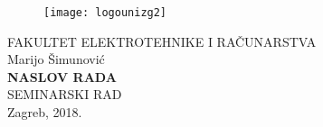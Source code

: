 \documentclass[12pt,oneside, a4paper]{article}
\numberwithin{equation}{section}
\renewcommand{\_}{\textscale{.7}{\textunderscore}}
\begin{document}
\begin{titlepage}
  \fontsize{16pt}{20pt}\selectfont
  \selectfont
  \setlength{\intextsep}{0pt plus 0pt minus 0pt}

  \begin{center}
    \begin{figure}[ht!]
      \begin{center}
        \texttt{[image: logo\_unizg2]}
      \end{center}
    \end{figure}		
    \vspace{0cm}
    {FAKULTET ELEKTROTEHNIKE I RAČUNARSTVA} \\
    \vspace{3cm}
    Marijo Šimunović \\
    \vspace{2cm}
    {\fontsize{22pt}{22pt}\selectfont\textbf{NASLOV RADA}} \\
    \vspace{2cm}    
    SEMINARSKI RAD \\
    \vspace{5cm}    %
    \vfill{Zagreb, 2018.}
  \end{center}
  \restoregeometry
\end{titlepage}

\tableofcontents
\clearpage
\listoffigures
\clearpage %
\listoftables

\clearpage


\clearpage


\clearpage


\clearpage


\clearpage


\clearpage


\clearpage


\clearpage

\clearpage %
 


\end{document}

